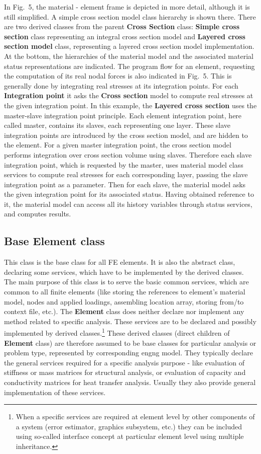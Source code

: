 \documentclass[12pt,draft]{article}
\newcommand{\class}[1]{{\bf #1}}
\begin{document}
In Fig.~5, the material - element frame is
depicted in more detail, although it is still simplified. A simple cross
section model class hierarchy is shown there. There are two 
derived classes from the parent \class{Cross Section} class: \class{Simple cross section}
class representing an integral cross section model and \class{Layered cross
section model} class, representing a layered cross section model
implementation. At the bottom,  the hierarchies of the material model and
the associated material status representations are indicated.
The program flow for an element, requesting the computation of its real nodal forces is also
indicated in Fig.~5. This is generally done by integrating real stresses at its integration
points. For each \class{Integration point} it asks the \class{Cross section} model to
compute real stresses at the given integration point. In this example,
the \class{Layered cross section} uses the master-slave integration point
principle. Each element integration point, here called master,
contains its slaves, each representing one layer. These slave
integration points are introduced by the cross section model, and are
hidden to the element. For a given master integration point, the cross section
model performs integration  over cross section
volume using slaves. Therefore  each slave integration point, which is requested
by the master, uses material model class services to compute real
stresses for each corresponding layer, passing the slave integration point as
a parameter. Then for each slave, the material model asks the given integration
point for its associated status.  Having obtained reference to it,
the material model can access all its history variables through status
services, and computes results.

\subsection{Base Element class}
This class is the base class for all FE elements. It is also the
abstract class, declaring some services, which have to be implemented
by the derived classes. The main purpose of this class is to serve the
basic common services, which are common to all finite elements (like
storing the references to element's material model, nodes and applied
loadings, assembling location array, storing
from/to context file, etc.). The \class{Element} class does neither declare nor
implement any method related to specific analysis. These services are to be declared
and possibly implemented by derived classes.\footnote{
When a specific services are required at element level by other
components of a system (error estimator, graphics subsystem, etc.)
they can be included using so-called interface concept at particular
element level using  multiple inheritance.} These derived classes
(direct children of \class{Element} class) are therefore assumed to be base
classes for particular analysis or problem type, represented by
corresponding engng model. They typically
declare the general services required for a specific analysis purpose
- like evaluation of stiffness or mass matrices for structural
analysis, or evaluation of capacity and conductivity matrices for heat
transfer analysis. Usually they also provide general implementation of
these services.
\end{document}
